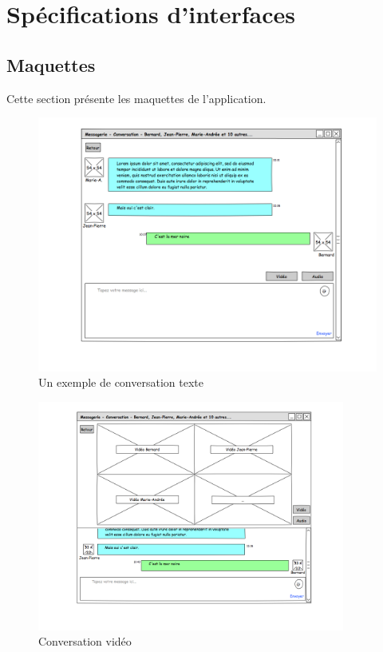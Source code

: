 \documentclass[11pt,dvipsnames,svgnames]{report}
\begin{document}
\section{Spécifications d'interfaces}
\subsection*{Maquettes}

Cette section présente les maquettes de l'application.

\begin{figure}[H]
\caption{Un exemple de conversation texte}
\centerline{\includegraphics[width=.9\linewidth]{maquette/maquette1.png}}
\end{figure}

\begin{figure}[H]
\caption{Conversation vidéo}
\centerline{\includegraphics[width=0.9\textwidth]{maquette/maquette4.png}}
\end{figure}
\end{document}
